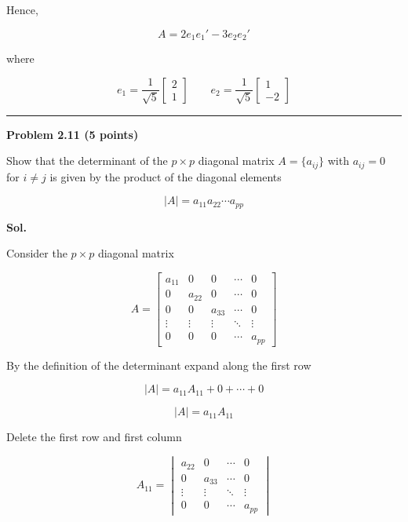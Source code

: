 \documentclass[12pt]{article}
\begin{document}
\noindent
Hence,

\[
\boxed{
A
=
2e_1e_1'
-
3e_2e_2'
}
\]

\noindent
where

\[
\boxed{
e_1=
\frac{1}{\sqrt{5}}
\begin{bmatrix}
2\\
1
\end{bmatrix}
\qquad
e_2=
\frac{1}{\sqrt{5}}
\begin{bmatrix}
1\\
-2
\end{bmatrix}
}
\]

\vspace{1cm}

\hrule

\vspace{0.7cm}

\noindent
\textbf{Problem 2.11 (5 points)}

\vspace{0.5cm}

\noindent
Show that the determinant of the \(p\times p\) diagonal matrix \(A=\{a_{ij}\}\) with \(a_{ij}=0\) for \(i\neq j\) is given by the product of the diagonal elements

\[
|A|=a_{11}a_{22}\cdots a_{pp}
\]

\vspace{0.5cm}

\noindent
\textbf{Sol.}

\vspace{0.3cm}

\noindent
Consider the \(p\times p\) diagonal matrix

\[
A=
\begin{bmatrix}
a_{11} & 0 & 0 & \cdots & 0\\
0 & a_{22} & 0 & \cdots & 0\\
0 & 0 & a_{33} & \cdots & 0\\
\vdots & \vdots & \vdots & \ddots & \vdots\\
0 & 0 & 0 & \cdots & a_{pp}
\end{bmatrix}
\]

\noindent
By the definition of the determinant expand along the first row

\[
|A|
=
a_{11}A_{11}
+
0
+\cdots+
0
\]

\[
|A|
=
a_{11}A_{11}
\]

\noindent
Delete the first row and first column

\[
A_{11}
=
\begin{vmatrix}
a_{22} & 0 & \cdots & 0\\
0 & a_{33} & \cdots & 0\\
\vdots & \vdots & \ddots & \vdots\\
0 & 0 & \cdots & a_{pp}
\end{vmatrix}
\]
\end{document}
